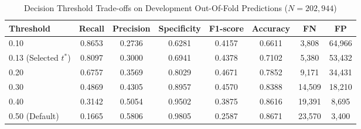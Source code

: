 \begin{table}[htbp]
\centering
\caption{Decision Threshold Trade-offs on Development Out-Of-Fold Predictions ($N = 202,944$)}
\label{tab:threshold_analysis}
\footnotesize
\setlength{\tabcolsep}{2.5pt}
\begin{tabular}{@{}lccccccc@{}}
\toprule
\textbf{Threshold} & \textbf{Recall} & \textbf{Precision} & \textbf{Specificity} & \textbf{F1-score} & \textbf{Accuracy} & \textbf{FN} & \textbf{FP} \\
\midrule
0.10 & 0.8653 & 0.2736 & 0.6281 & 0.4157 & 0.6611 & 3,808 & 64,966 \\
0.13 (Selected $t^*$) & 0.8097 & 0.3000 & 0.6941 & 0.4378 & 0.7102 & 5,380 & 53,432 \\
0.20 & 0.6757 & 0.3569 & 0.8029 & 0.4671 & 0.7852 & 9,171 & 34,431 \\
0.30 & 0.4869 & 0.4305 & 0.8957 & 0.4570 & 0.8388 & 14,509 & 18,210 \\
0.40 & 0.3142 & 0.5054 & 0.9502 & 0.3875 & 0.8616 & 19,391 & 8,695 \\
0.50 (Default) & 0.1665 & 0.5806 & 0.9805 & 0.2587 & 0.8671 & 23,570 & 3,400 \\
\bottomrule
\end{tabular}
\end{table}
